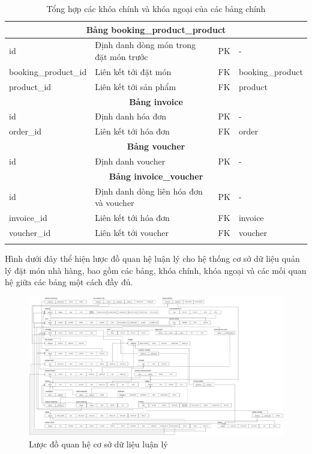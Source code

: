 \begin{longtable}{|l|p{6cm}|l|l|}
\multicolumn{4}{|c|}{\textbf{Bảng booking\_product\_product}} \\
\hline
id & Định danh dòng món trong đặt món trước & PK & - \\
booking\_product\_id & Liên kết tới đặt món & FK & booking\_product \\
product\_id & Liên kết tới sản phẩm & FK & product \\
\hline

\multicolumn{4}{|c|}{\textbf{Bảng invoice}} \\
\hline
id & Định danh hóa đơn & PK & - \\
order\_id & Liên kết tới hóa đơn & FK & order \\
\hline

\multicolumn{4}{|c|}{\textbf{Bảng voucher}} \\
\hline
id & Định danh voucher & PK & - \\
\hline

\multicolumn{4}{|c|}{\textbf{Bảng invoice\_voucher}} \\
\hline
id & Định danh dòng liên hóa đơn và voucher & PK & - \\
invoice\_id & Liên kết tới hóa đơn & FK & invoice \\
voucher\_id & Liên kết tới voucher & FK & voucher \\
\hline

\caption{Tổng hợp các khóa chính và khóa ngoại của các bảng chính}
\end{longtable}

Hình dưới đây thể hiện lược đồ quan hệ luận lý cho hệ thống cơ sở dữ liệu quản lý đặt món nhà hàng, bao gồm các bảng, khóa chính, khóa ngoại và các mối quan hệ giữa các bảng một cách đầy đủ.

\begin{landscape}

\begin{figure}[H]
    \centering
    \includegraphics[height=0.9\textheight]{Images/relation.png}
    \vspace{0.5cm}
    \caption{Lược đồ quan hệ cơ sở dữ liệu luận lý}
    \label{fig:my_label}
\end{figure}

\end{landscape}


